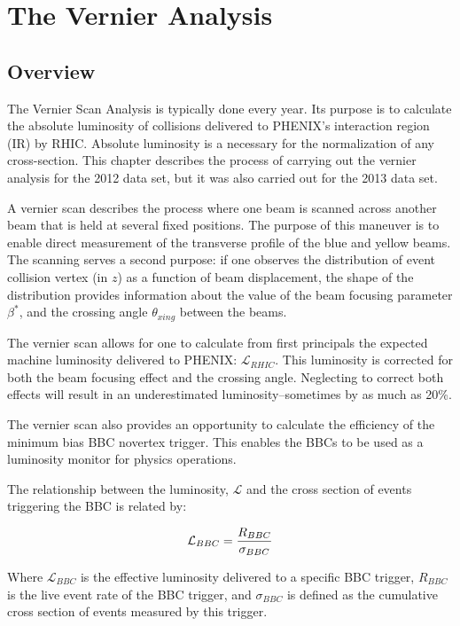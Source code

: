 \chapter{The Vernier Analysis}
\label{ch:vernier_analysis}
\section{Overview}

The Vernier Scan Analysis is typically done every year. Its purpose is to
calculate the absolute luminosity of collisions delivered to PHENIX's
interaction region (IR) by RHIC.  Absolute luminosity is a necessary for the
normalization of any cross-section. This chapter describes the process of
carrying out the vernier analysis for the 2012 data set, but it was also
carried out for the 2013 data set.

A vernier scan describes the process where one beam is scanned across another
beam that is held at several fixed positions. The purpose of this maneuver is to
enable direct measurement of the transverse profile of the blue and yellow
beams. The scanning serves a second purpose: if one observes the distribution of
event collision vertex (in $z$) as a function of beam displacement, the shape of
the distribution provides information about the value of the beam focusing
parameter $\beta^*$, and the crossing angle $\theta_{xing}$ between the beams.

The vernier scan allows for one to calculate from first principals the expected
machine luminosity delivered to PHENIX: $\mathcal{L}_{RHIC}$. This luminosity is
corrected for both the beam focusing effect and the crossing angle. Neglecting
to correct both effects will result in an underestimated luminosity--sometimes
by as much as 20\%.

The vernier scan also provides an opportunity to calculate the efficiency of the
minimum bias BBC novertex trigger. This enables the BBCs to be used as a
luminosity monitor for physics operations. 

The relationship between the luminosity, $\mathcal{L}$ and the cross section of
events triggering the BBC is related by:

\begin{equation} 
\label{eq:lumi_xsec_simple} 
\mathcal{L}_{BBC} = {R_{BBC}\over\sigma_{BBC}} 
\end{equation}

{\noindent}Where $\mathcal{L}_{BBC}$ is the effective luminosity delivered to a
specific BBC trigger, $R_{BBC}$ is the live event rate of the BBC trigger, and
$\sigma_{BBC}$ is defined as the cumulative cross section of events measured by
this trigger.

